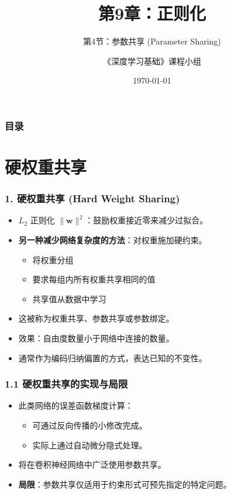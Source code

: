 \documentclass[t,aspectratio=169]{beamer} %
\title[9.4.参数共享]{第9章：正则化}
\subtitle{第4节：参数共享 (Parameter Sharing)}
\author{《深度学习基础》课程小组}
\date{\today}
\begin{document}
\frame{\titlepage}

\begin{frame}
    \frametitle{目录}
    \tableofcontents
\end{frame}

\section{硬权重共享}

\begin{frame}
    \frametitle{1. 硬权重共享 (Hard Weight Sharing)}
    \begin{itemize}
        \item $L_2$ 正则化 $\|\mathbf{w}\|^2$：鼓励权重接近零来减少过拟合。
        \item \textbf{另一种减少网络复杂度的方法}：对权重施加\alert{硬约束}。
        \begin{itemize}
            \item 将权重分组
            \item 要求每组内所有权重\alert{共享相同的值}
            \item 共享值从数据中学习
        \end{itemize}
        \item 这被称为\alert{权重共享}、\alert{参数共享}或\alert{参数绑定}。
        \item 效果：\alert{自由度数量小于网络中连接的数量}。
        \item 通常作为编码\alert{归纳偏置}的方式，表达已知的不变性。
    \end{itemize}
\end{frame}

\begin{frame}
    \frametitle{1.1 硬权重共享的实现与局限}
    \begin{itemize}
        \item 此类网络的误差函数梯度计算：
        \begin{itemize}
            \item 可通过\alert{反向传播的小修改}完成。
            \item 实际上通过\alert{自动微分}隐式处理。
        \end{itemize}
        \item 将在\alert{卷积神经网络}中广泛使用参数共享。
        \item \textbf{局限}：参数共享仅适用于\alert{约束形式可预先指定}的特定问题。
    \end{itemize}
\end{frame}
\end{document}
